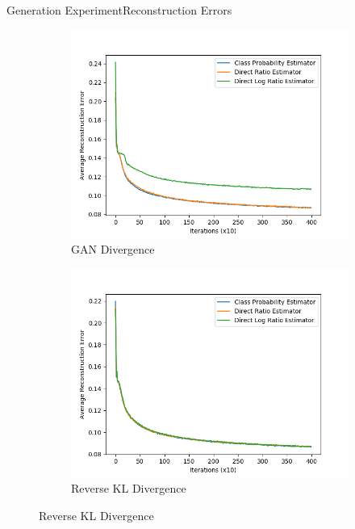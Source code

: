 \documentclass{beamer}
\begin{document}
\begin{frame}{Generation Experiment}{Reconstruction Errors}
\begin{figure}
\begin{subfigure}{0.49\textwidth}
\includegraphics[width=\linewidth]{part3reconerrors/PCADVvsPCADVexpvsPCADVgudlog.png}
\caption{GAN Divergence}
\end{subfigure}
\begin{subfigure}{0.49\textwidth}
\includegraphics[width=\linewidth]{part3reconerrors/PCKLDvsPCKLexpvsPCKLgudlog.png}
\caption{Reverse KL Divergence}
\end{subfigure}
\end{figure}
\end{frame}
\end{document}

